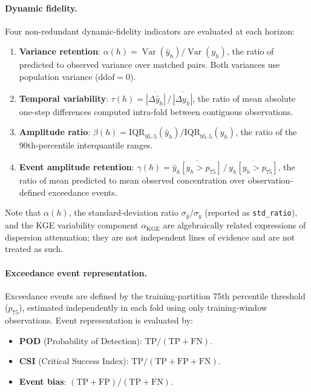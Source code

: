 \documentclass[12pt]{article}
\begin{document}
\paragraph{Dynamic fidelity.}
Four non-redundant dynamic-fidelity indicators are evaluated at
each horizon:
\begin{enumerate}
  \item \textbf{Variance retention}:
    $\alpha(h) = \operatorname{Var}(\hat{y}_h) / \operatorname{Var}(y_h)$,
    the ratio of predicted to observed variance over matched pairs.
    Both variances use population variance ($\mathrm{ddof}=0$).
  \item \textbf{Temporal variability}:
    $\tau(h) = \overline{|\Delta\hat{y}_h|} \,/\, \overline{|\Delta y_h|}$,
    the ratio of mean absolute one-step differences computed
    intra-fold between contiguous observations.
  \item \textbf{Amplitude ratio}:
    $\beta(h) = \mathrm{IQR}_{95\text{--}5}(\hat{y}_h) / \mathrm{IQR}_{95\text{--}5}(y_h)$,
    the ratio of the 90th-percentile interquantile ranges.
  \item \textbf{Event amplitude retention}:
    $\gamma(h) = \overline{\hat{y}_h[y_h > p_{75}]} \,/\,
    \overline{y_h[y_h > p_{75}]}$,
    the ratio of mean predicted to mean observed concentration
    over observation-defined exceedance events.
\end{enumerate}
Note that $\alpha(h)$, the standard-deviation ratio
$\sigma_{\hat{y}} / \sigma_{y}$ (reported as \texttt{std\_ratio}),
and the KGE variability component $\alpha_\mathrm{KGE}$ are
algebraically related expressions of dispersion attenuation;
they are not independent lines of evidence and are not treated
as such.

\paragraph{Exceedance event representation.}
Exceedance events are defined by the training-partition 75th
percentile threshold ($p_{75}$), estimated independently in each fold
using only training-window observations. Event representation is
evaluated by:
\begin{itemize}
  \item \textbf{POD} (Probability of Detection):
    $\mathrm{TP} / (\mathrm{TP} + \mathrm{FN})$.
  \item \textbf{CSI} (Critical Success Index):
    $\mathrm{TP} / (\mathrm{TP} + \mathrm{FP} + \mathrm{FN})$.
  \item \textbf{Event bias}:
    $(\mathrm{TP} + \mathrm{FP}) / (\mathrm{TP} + \mathrm{FN})$.
\end{itemize}
\end{document}

